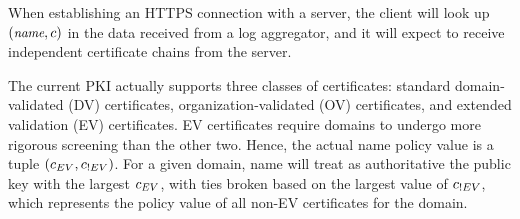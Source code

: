 When establishing an HTTPS connection with a server,
the client will look up $(\small{\emph{name}}, c)$ in the data received
from a log aggregator, and it will expect to receive \policy
independent certificate chains from the server.

The current PKI actually supports three classes of certificates: standard
domain-validated (DV) certificates, organization-validated (OV) certificates,
and extended validation (EV) certificates. EV certificates require domains to
undergo more rigorous screening than the other two.
Hence, the actual \ac{name} policy value is a tuple $(c_{EV},
c_{!EV})$. For a given domain, \ac{name} will treat as authoritative the
public key with the largest $c_{EV}$, with ties broken based on the
largest value of $c_{!EV}$, which represents the policy value of all
non-EV certificates for the domain.





